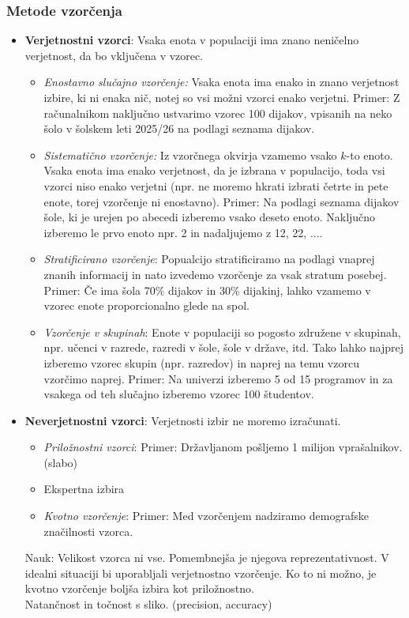 \subsubsection*{Metode vzorčenja}
\begin{itemize}
    \item \textbf{Verjetnostni vzorci}: Vsaka enota v populaciji ima znano neničelno verjetnost, da bo vključena v vzorec.
    \begin{itemize}
        \item \textit{Enostavno slučajno vzorčenje:} Vsaka enota ima enako in znano verjetnost izbire, ki ni enaka nič, notej so vsi možni vzorci enako verjetni. Primer: Z računalnikom naključno ustvarimo vzorec 100 dijakov, vpisanih na neko šolo v šolskem leti 2025/26 na podlagi seznama dijakov.
        \item \textit{Sistematično vzorčenje:} Iz vzorčnega okvirja vzamemo vsako $k$-to enoto. Vsaka enota ima enako verjetnost, da je izbrana v populacijo, toda vsi vzorci niso enako verjetni (npr. ne moremo hkrati izbrati četrte in pete enote, torej vzorčenje ni enostavno). Primer: Na podlagi seznama dijakov šole, ki je urejen po abecedi izberemo vsako deseto enoto. Naključno izberemo le prvo enoto npr. 2 in nadaljujemo z 12, 22, ....
        \item \textit{Stratificirano vzorčenje}: Popualcijo stratificiramo na podlagi vnaprej znanih informacij in nato izvedemo vzorčenje za vsak stratum posebej. Primer: Če ima šola 70\% dijakov in 30\% dijakinj, lahko vzamemo v vzorec enote proporcionalno glede na spol.
        \item \textit{Vzorčenje v skupinah}: Enote v populaciji so pogosto združene v skupinah, npr. učenci v razrede, razredi v šole, šole v države, itd. Tako lahko najprej izberemo vzorec skupin (npr. razredov) in naprej na temu vzorcu vzorčimo naprej. Primer: Na univerzi izberemo 5 od 15 programov in za vsakega od teh slučajno izberemo vzorec 100 študentov.
    \end{itemize}
    \item \textbf{Neverjetnostni vzorci}: Verjetnosti izbir ne moremo izračunati.
    \begin{itemize}
        \item \textit{Priložnostni vzorci}: Primer: Državljanom pošljemo 1 milijon vprašalnikov. (slabo)
        \item Ekspertna izbira
        \item \textit{Kvotno vzorčenje}: Primer: Med vzorčenjem nadziramo demografske značilnosti vzorca.
    \end{itemize}
    Nauk: Velikost vzorca ni vse. Pomembnejša je njegova reprezentativnost. V idealni situaciji bi uporabljali verjetnostno vzorčenje. Ko to ni možno, je kvotno vzorčenje boljša izbira kot priložnostno.\\
    Natančnost in točnost s sliko. (precision, accuracy)
\end{itemize}

